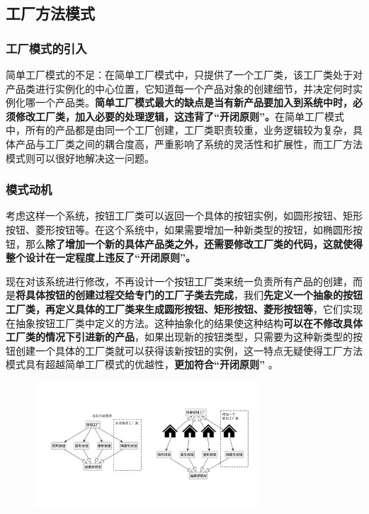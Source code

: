 \subsection{工厂方法模式}

\subsubsection{工厂模式的引入}
简单工厂模式的不足：在简单工厂模式中，只提供了一个工厂类，该工厂类处于对产品类进行实例化的中心位置，它知道每一个产品对象的创建细节，并决定何时实例化哪一个产品类。\textbf{简单工厂模式最大的缺点是当有新产品要加入到系统中时，必须修改工厂类，加入必要的处理逻辑，这违背了“开闭原则”。}在简单工厂模式中，所有的产品都是由同一个工厂创建，工厂类职责较重，业务逻辑较为复杂，具体产品与工厂类之间的耦合度高，严重影响了系统的灵活性和扩展性，而工厂方法模式则可以很好地解决这一问题。

\subsubsection{模式动机}
考虑这样一个系统，按钮工厂类可以返回一个具体的按钮实例，如圆形按钮、矩形按钮、菱形按钮等。在这个系统中，如果需要增加一种新类型的按钮，如椭圆形按钮，那么\textbf{除了增加一个新的具体产品类之外，还需要修改工厂类的代码，这就使得整个设计在一定程度上违反了“开闭原则”。}

现在对该系统进行修改，不再设计一个按钮工厂类来统一负责所有产品的创建，而是\textbf{将具体按钮的创建过程交给专门的工厂子类去完成}，我们\textbf{先定义一个抽象的按钮工厂类，再定义具体的工厂类来生成圆形按钮、矩形按钮、菱形按钮等}，它们实现在抽象按钮工厂类中定义的方法。这种抽象化的结果使这种结构\textbf{可以在不修改具体工厂类的情况下引进新的产品}，如果出现新的按钮类型，只需要为这种新类型的按钮创建一个具体的工厂类就可以获得该新按钮的实例，这一特点无疑使得工厂方法模式具有超越简单工厂模式的优越性，\textbf{更加符合“开闭原则” }。
\begin{figure}[H]
    \vspace{-0.5em}
	\centering
	\includegraphics[width=0.75\textwidth]{images/工厂模式动机.pdf}
    \vspace{-1em}
\end{figure}

